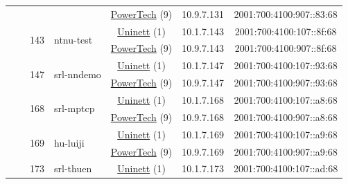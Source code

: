 \begin{small}
\begin{center}
\begin{longtable}{|c|c|c|c|c|c|c|c|}
  &  &  &  & \multicolumn{2}{|c|}{\tiny{\href{http://www.powertech.no}{PowerTech} (9)}} & \tiny{10.9.7.131} & \tiny{2001:700:4100:907::83:68} \\* \cline{3-3}\cline{4-4}\cline{5-5}\cline{6-6}\cline{7-7}\cline{8-8}
  &  & \multirow{2}{*}{\tiny{143}} & \multicolumn{1}{|l|}{\multirow{2}{*}{\tiny{ntnu-test}}} & \multicolumn{2}{|c|}{\tiny{\href{https://www.uninett.no}{Uninett} (1)}} & \tiny{10.1.7.143} & \tiny{2001:700:4100:107::8f:68} \\* \cline{5-5}\cline{6-6}\cline{7-7}\cline{8-8}
  &  &  &  & \multicolumn{2}{|c|}{\tiny{\href{http://www.powertech.no}{PowerTech} (9)}} & \tiny{10.9.7.143} & \tiny{2001:700:4100:907::8f:68} \\* \cline{3-3}\cline{4-4}\cline{5-5}\cline{6-6}\cline{7-7}\cline{8-8}
  &  & \multirow{2}{*}{\tiny{147}} & \multicolumn{1}{|l|}{\multirow{2}{*}{\tiny{srl-nndemo}}} & \multicolumn{2}{|c|}{\tiny{\href{https://www.uninett.no}{Uninett} (1)}} & \tiny{10.1.7.147} & \tiny{2001:700:4100:107::93:68} \\* \cline{5-5}\cline{6-6}\cline{7-7}\cline{8-8}
  &  &  &  & \multicolumn{2}{|c|}{\tiny{\href{http://www.powertech.no}{PowerTech} (9)}} & \tiny{10.9.7.147} & \tiny{2001:700:4100:907::93:68} \\* \cline{3-3}\cline{4-4}\cline{5-5}\cline{6-6}\cline{7-7}\cline{8-8}
  &  & \multirow{2}{*}{\tiny{168}} & \multicolumn{1}{|l|}{\multirow{2}{*}{\tiny{srl-mptcp}}} & \multicolumn{2}{|c|}{\tiny{\href{https://www.uninett.no}{Uninett} (1)}} & \tiny{10.1.7.168} & \tiny{2001:700:4100:107::a8:68} \\* \cline{5-5}\cline{6-6}\cline{7-7}\cline{8-8}
  &  &  &  & \multicolumn{2}{|c|}{\tiny{\href{http://www.powertech.no}{PowerTech} (9)}} & \tiny{10.9.7.168} & \tiny{2001:700:4100:907::a8:68} \\* \cline{3-3}\cline{4-4}\cline{5-5}\cline{6-6}\cline{7-7}\cline{8-8}
  &  & \multirow{2}{*}{\tiny{169}} & \multicolumn{1}{|l|}{\multirow{2}{*}{\tiny{hu-luiji}}} & \multicolumn{2}{|c|}{\tiny{\href{https://www.uninett.no}{Uninett} (1)}} & \tiny{10.1.7.169} & \tiny{2001:700:4100:107::a9:68} \\* \cline{5-5}\cline{6-6}\cline{7-7}\cline{8-8}
  &  &  &  & \multicolumn{2}{|c|}{\tiny{\href{http://www.powertech.no}{PowerTech} (9)}} & \tiny{10.9.7.169} & \tiny{2001:700:4100:907::a9:68} \\* \cline{3-3}\cline{4-4}\cline{5-5}\cline{6-6}\cline{7-7}\cline{8-8}
  &  & \multirow{2}{*}{\tiny{173}} & \multicolumn{1}{|l|}{\multirow{2}{*}{\tiny{srl-thuen}}} & \multicolumn{2}{|c|}{\tiny{\href{https://www.uninett.no}{Uninett} (1)}} & \tiny{10.1.7.173} & \tiny{2001:700:4100:107::ad:68} \\* \cline{5-5}\cline{6-6}\cline{7-7}\cline{8-8}

\end{longtable}
\end{center}
\end{small}
